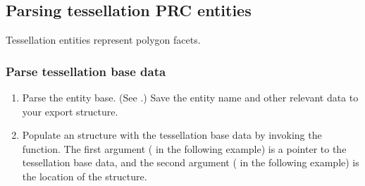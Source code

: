 \documentclass[letterpaper,12pt,english,openany,oneside]{sphinxmanual}
\begin{document}
\subsection{Parsing tessellation PRC entities}
\label{\detokenize{Plugins_A3D_API:parsing-tessellation-prc-entities}}
Tessellation entities represent polygon facets.


\subsubsection{Parse tessellation base data}
\label{\detokenize{Plugins_A3D_API:parse-tessellation-base-data}}\begin{enumerate}
%
\item {} 
Parse the entity base. (See .) Save the entity name and other relevant data to your export structure.

\item {} 
Populate an  structure with the tessellation base data by invoking the  function. The first argument ( in the following example) is a pointer to the tessellation base data, and the second argument ( in the following example) is the location of the  structure.

\end{enumerate}
\end{document}
